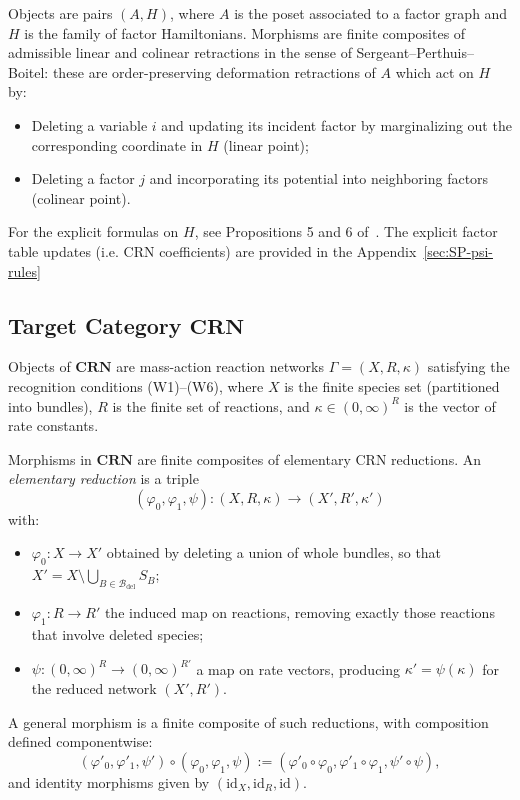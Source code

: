 \documentclass{article}
\theoremstyle{plain}
\theoremstyle{definition}
\theoremstyle{remark}
\newcommand{\<}{\langle}
\renewcommand{\>}{\rangle}
\begin{document}
Objects are pairs $(A, H)$, where $A$ is the poset associated to a factor graph and 
$H$ is the family of factor Hamiltonians. Morphisms are finite composites of admissible 
linear and colinear retractions in the sense of Sergeant--Perthuis--Boitel: these are 
order-preserving deformation retractions of $A$ which act on $H$ by:
\begin{itemize}
\item Deleting a variable $i$ and updating its incident factor by marginalizing out 
the corresponding coordinate in $H$ (linear point);
\item Deleting a factor $j$ and incorporating its potential into neighboring factors 
(colinear point).
\end{itemize}

For the explicit formulas on $H$, see Propositions 5 and 6 of~\cite{sergeantperthuis2025minimacriticalpointsbethe}. The explicit factor table updates (i.e. CRN coefficients) are provided in the Appendix~\ref{sec:SP-psi-rules}

\subsection{Target Category $\mathbf{CRN}$}

Objects of $\mathbf{CRN}$ are mass-action reaction networks $\Gamma = (X, R, \kappa)$ 
satisfying the recognition conditions (W1)--(W6), where $X$ is the finite species set 
(partitioned into bundles), $R$ is the finite set of reactions, and 
$\kappa \in (0, \infty)^R$ is the vector of rate constants.

Morphisms in $\mathbf{CRN}$ are finite composites of elementary CRN reductions. 
An \emph{elementary reduction} is a triple
\[
(\varphi_0, \varphi_1, \psi) : (X, R, \kappa) \longrightarrow (X', R', \kappa')
\]
with:
\begin{itemize}
\item $\varphi_0 : X \to X'$ obtained by deleting a union of whole bundles, so that 
$X' = X \setminus \bigcup_{B \in \mathcal{B}_{\mathrm{del}}} S_B$;
\item $\varphi_1 : R \to R'$ the induced map on reactions, removing exactly those 
reactions that involve deleted species;
\item $\psi : (0, \infty)^R \to (0, \infty)^{R'}$ a map on rate vectors, producing 
$\kappa' = \psi(\kappa)$ for the reduced network $(X', R')$.
\end{itemize}

A general morphism is a finite composite of such reductions, with composition defined 
componentwise:
\[
(\varphi'_0, \varphi'_1, \psi') \circ (\varphi_0, \varphi_1, \psi) := 
(\varphi'_0 \circ \varphi_0, \varphi'_1 \circ \varphi_1, \psi' \circ \psi),
\]
and identity morphisms given by $(\mathrm{id}_X, \mathrm{id}_R, \mathrm{id})$.
\end{document}
